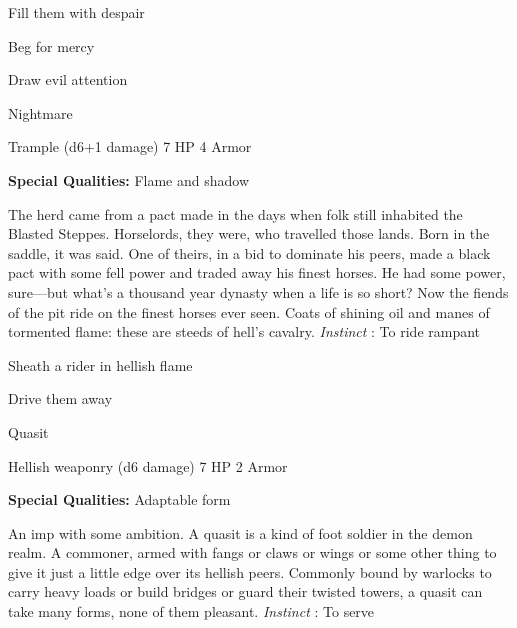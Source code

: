\startitemize[1,packed]

\item Fill them with despair

 
\item Beg for mercy

 
\item Draw evil attention


\stopitemize
 
\startMonsterName
Nightmare	 
\stopMonsterName
 

Trample (d6+1 damage)	7 HP	4 Armor

 


 
\startMonsterQualities
{\bf Special Qualities:}  Flame and shadow
\stopMonsterQualities
 
\startMonsterDescription
The herd came from a pact made in the days when folk still inhabited the Blasted Steppes. Horselords, they were, who travelled those lands. Born in the saddle, it was said. One of theirs, in a bid to dominate his peers, made a black pact with some fell power and traded away his finest horses. He had some power, sure—but what’s a thousand year dynasty when a life is so short? Now the fiends of the pit ride on the finest horses ever seen. Coats of shining oil and manes of tormented flame: these are steeds of hell’s cavalry. {\em Instinct} : To ride rampant
\stopMonsterDescription
 
\startitemize[1,packed]

\item Sheath a rider in hellish flame

 
\item Drive them away


\stopitemize
 
\startMonsterName
Quasit	 
\stopMonsterName
 

Hellish weaponry (d6 damage)	7 HP	2 Armor

 


 
\startMonsterQualities
{\bf Special Qualities:}  Adaptable form
\stopMonsterQualities
 
\startMonsterDescription
An imp with some ambition. A quasit is a kind of foot soldier in the demon realm. A commoner, armed with fangs or claws or wings or some other thing to give it just a little edge over its hellish peers. Commonly bound by warlocks to carry heavy loads or build bridges or guard their twisted towers, a quasit can take many forms, none of them pleasant. {\em Instinct} : To serve
\stopMonsterDescription
 

